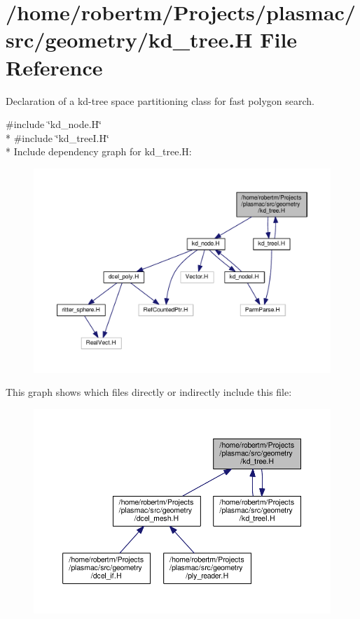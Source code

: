 \hypertarget{kd__tree_8H}{}\section{/home/robertm/\+Projects/plasmac/src/geometry/kd\+\_\+tree.H File Reference}
\label{kd__tree_8H}


Declaration of a kd-\/tree space partitioning class for fast polygon search.  


{\ttfamily \#include \char`\"{}kd\+\_\+node.\+H\char`\"{}}\\*
{\ttfamily \#include \char`\"{}kd\+\_\+tree\+I.\+H\char`\"{}}\\*
Include dependency graph for kd\+\_\+tree.\+H\+:\nopagebreak
\begin{figure}[H]
\begin{center}
\leavevmode
\includegraphics[width=350pt]{kd__tree_8H__incl}
\end{center}
\end{figure}
This graph shows which files directly or indirectly include this file\+:\nopagebreak
\begin{figure}[H]
\begin{center}
\leavevmode
\includegraphics[width=350pt]{kd__tree_8H__dep__incl}
\end{center}
\end{figure}
